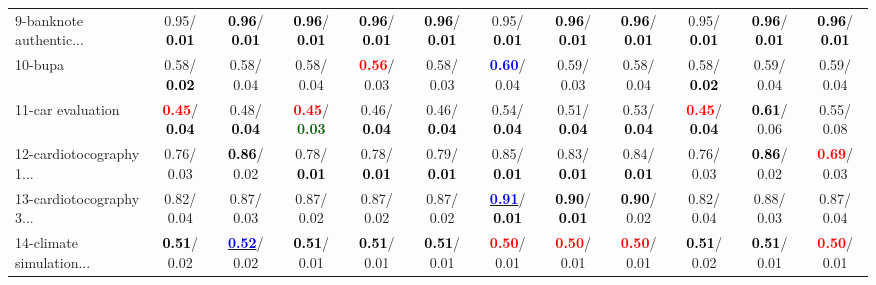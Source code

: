 \begin{table}[h]
\begin{center}
{\begin{tabular}{lc|c|c|c|c|c|c|c|c|c|c}
9-banknote authentic... &   0.95/\textcolor{black}{\textbf{  0.01}} & \textcolor{black}{\textbf{  0.96}}/\textcolor{black}{\textbf{  0.01}} & \textcolor{black}{\textbf{  0.96}}/\textcolor{black}{\textbf{  0.01}} & \textcolor{black}{\textbf{  0.96}}/\textcolor{black}{\textbf{  0.01}} & \textcolor{black}{\textbf{  0.96}}/\textcolor{black}{\textbf{  0.01}} &   0.95/\textcolor{black}{\textbf{  0.01}} & \textcolor{black}{\textbf{  0.96}}/\textcolor{black}{\textbf{  0.01}} & \textcolor{black}{\textbf{  0.96}}/\textcolor{black}{\textbf{  0.01}} &   0.95/\textcolor{black}{\textbf{  0.01}} & \textcolor{black}{\textbf{  0.96}}/\textcolor{black}{\textbf{  0.01}} & \textcolor{black}{\textbf{  0.96}}/\textcolor{black}{\textbf{  0.01}} \\
10-bupa &   0.58/\textcolor{black}{\textbf{  0.02}} &   0.58/  0.04 &   0.58/  0.04 & \textcolor{red}{\textbf{  0.56}}/  0.03 &   0.58/  0.03 & \textcolor{blue}{\textbf{  0.60}}/  0.04 &   0.59/  0.03 &   0.58/  0.04 &   0.58/\textcolor{black}{\textbf{  0.02}} &   0.59/  0.04 &   0.59/  0.04 \\
11-car evaluation & \textcolor{red}{\textbf{  0.45}}/\textcolor{black}{\textbf{  0.04}} &   0.48/\textcolor{black}{\textbf{  0.04}} & \textcolor{red}{\textbf{  0.45}}/\textcolor{darkgreen}{\textbf{  0.03}} &   0.46/\textcolor{black}{\textbf{  0.04}} &   0.46/\textcolor{black}{\textbf{  0.04}} &   0.54/\textcolor{black}{\textbf{  0.04}} &   0.51/\textcolor{black}{\textbf{  0.04}} &   0.53/\textcolor{black}{\textbf{  0.04}} & \textcolor{red}{\textbf{  0.45}}/\textcolor{black}{\textbf{  0.04}} & \textcolor{black}{\textbf{  0.61}}/  0.06 &   0.55/  0.08 \\
12-cardiotocography 1... &   0.76/  0.03 & \textcolor{black}{\textbf{  0.86}}/  0.02 &   0.78/\textcolor{black}{\textbf{  0.01}} &   0.78/\textcolor{black}{\textbf{  0.01}} &   0.79/\textcolor{black}{\textbf{  0.01}} &   0.85/\textcolor{black}{\textbf{  0.01}} &   0.83/\textcolor{black}{\textbf{  0.01}} &   0.84/\textcolor{black}{\textbf{  0.01}} &   0.76/  0.03 & \textcolor{black}{\textbf{  0.86}}/  0.02 & \textcolor{red}{\textbf{  0.69}}/  0.03 \\
13-cardiotocography 3... &   0.82/  0.04 &   0.87/  0.03 &   0.87/  0.02 &   0.87/  0.02 &   0.87/  0.02 & \underline{\textcolor{blue}{\textbf{  0.91}}}/\textcolor{black}{\textbf{  0.01}} & \textcolor{black}{\textbf{  0.90}}/\textcolor{black}{\textbf{  0.01}} & \textcolor{black}{\textbf{  0.90}}/  0.02 &   0.82/  0.04 &   0.88/  0.03 &   0.87/  0.04 \\
14-climate simulation... & \textcolor{black}{\textbf{  0.51}}/  0.02 & \underline{\textcolor{blue}{\textbf{  0.52}}}/  0.02 & \textcolor{black}{\textbf{  0.51}}/  0.01 & \textcolor{black}{\textbf{  0.51}}/  0.01 & \textcolor{black}{\textbf{  0.51}}/  0.01 & \textcolor{red}{\textbf{  0.50}}/  0.01 & \textcolor{red}{\textbf{  0.50}}/  0.01 & \textcolor{red}{\textbf{  0.50}}/  0.01 & \textcolor{black}{\textbf{  0.51}}/  0.02 & \textcolor{black}{\textbf{  0.51}}/  0.01 & \textcolor{red}{\textbf{  0.50}}/  0.01 \\ \hline

\end{tabular}}
\end{center}
\end{table}
